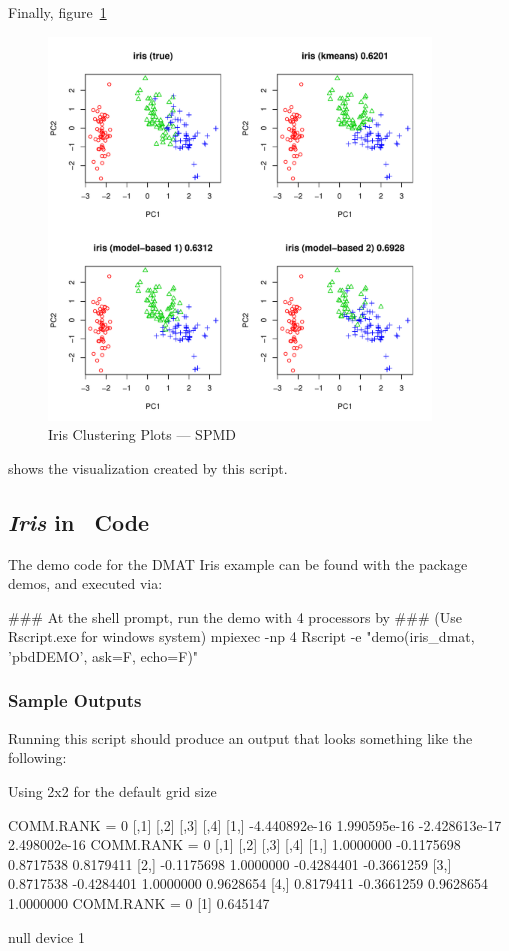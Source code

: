 Finally, figure~\ref{fig:iris_cluster_spmd}
\begin{figure}[h!bt]
  \centering
  \includegraphics[width=4in]{pbdDEMO-include/pics/spmd_plot.pdf}
  \caption{Iris Clustering Plots --- SPMD}
  \label{fig:iris_cluster_spmd}
\end{figure}
shows the visualization created by this script.




\subsection{{\it Iris} in \ Code}

The demo code for the DMAT Iris example can be found with the package demos,
and executed via:
\begin{Command}
### At the shell prompt, run the demo with 4 processors by
### (Use Rscript.exe for windows system)
mpiexec -np 4 Rscript -e "demo(iris_dmat, 'pbdDEMO', ask=F, echo=F)"
\end{Command}


\subsubsection{Sample Outputs}
Running this script should produce an output that looks something like the
following:
\begin{Output}
Using 2x2 for the default grid size

COMM.RANK = 0
              [,1]         [,2]          [,3]         [,4]
[1,] -4.440892e-16 1.990595e-16 -2.428613e-17 2.498002e-16
COMM.RANK = 0
           [,1]       [,2]       [,3]       [,4]
[1,]  1.0000000 -0.1175698  0.8717538  0.8179411
[2,] -0.1175698  1.0000000 -0.4284401 -0.3661259
[3,]  0.8717538 -0.4284401  1.0000000  0.9628654
[4,]  0.8179411 -0.3661259  0.9628654  1.0000000
COMM.RANK = 0
[1] 0.645147

null device 
          1 
\end{Output}

